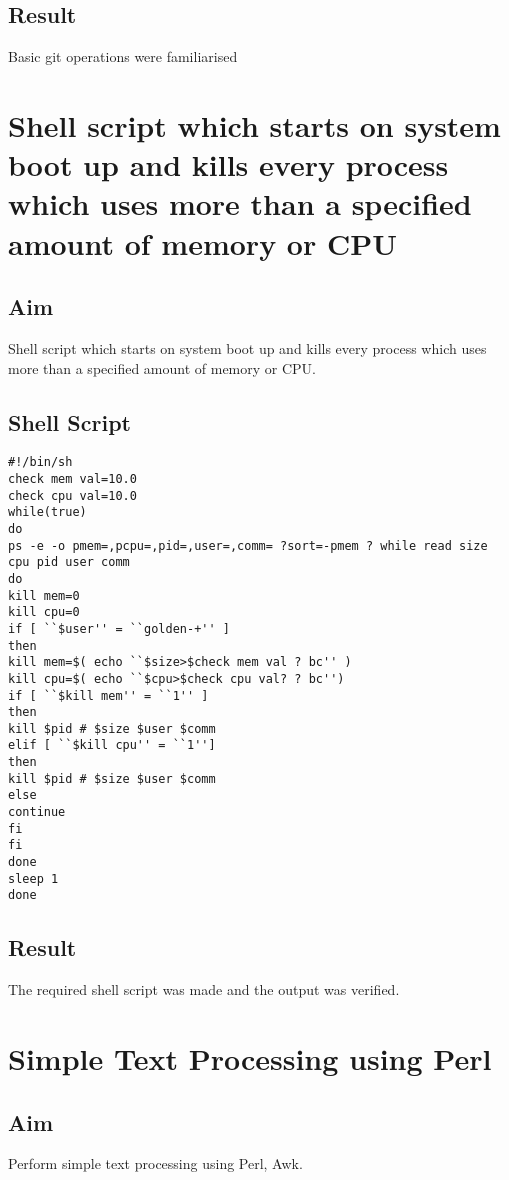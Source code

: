 \documentclass{article}
\begin{document}
\subsection{Result}

Basic git operations were familiarised

\newpage
\section{Shell script which starts on system boot up and kills every process which uses more than a specified amount of memory or CPU}

\subsection{Aim}
Shell script which starts on system boot up and kills every process which uses more than a specified amount of memory or CPU.

\subsection{Shell Script}
\begin{verbatim}
#!/bin/sh
check mem val=10.0
check cpu val=10.0
while(true)
do
ps -e -o pmem=,pcpu=,pid=,user=,comm= ?sort=-pmem ? while read size cpu pid user comm
do
kill mem=0
kill cpu=0
if [ ``$user'' = ``golden-+'' ]
then
kill mem=$( echo ``$size>$check mem val ? bc'' )
kill cpu=$( echo ``$cpu>$check cpu val? ? bc'')
if [ ``$kill mem'' = ``1'' ]
then
kill $pid # $size $user $comm
elif [ ``$kill cpu'' = ``1'']
then
kill $pid # $size $user $comm
else
continue
fi
fi
done
sleep 1
done
\end{verbatim}

\subsection{Result}
The required shell script was made and the output was verified.

\newpage
\section{Simple Text Processing using Perl}

\subsection{Aim}
Perform simple text processing using Perl, Awk.
\end{document}
